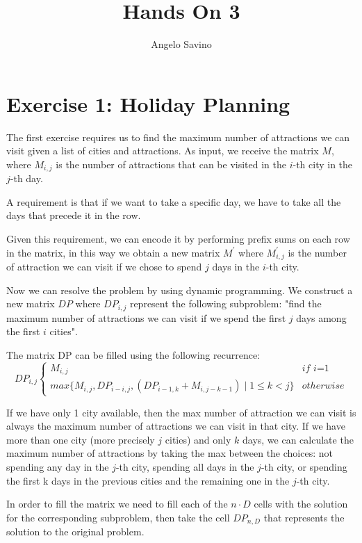 \documentclass[12pt,a4paper]{article}
\title{Hands On 3}
\author{Angelo Savino}
\begin{document}
\maketitle

\section*{Exercise 1: Holiday Planning}

The first exercise requires us to find the maximum number of attractions we can visit given a list of cities and attractions.
As input, we receive the matrix $M$, where $M_{i,j}$ is the number of attractions that can be visited in the $i$-th city in the $j$-th day. 

A requirement is that if we want to take a specific day, we have to take all the days that precede it in the row.

Given this requirement, we can encode it by performing prefix sums on each row in the matrix, in this way we obtain a new matrix $M^\prime$ where $M^\prime_{i,j}$ is the number of attraction we can visit if we chose to spend $j$ days in the $i$-th city.

Now we can resolve the problem by using dynamic programming. We construct a new matrix $DP$ where $DP_{i,j}$ represent the following subproblem: "find the maximum number of attractions we can visit if we spend the first $j$ days among the first $i$ cities".

The matrix DP can be filled using the following recurrence: 
\[
DP_{i,j} 
\left\{ 
    \begin{array}{lr}
        M_{i,j} &\textit{if i=1} \\
        max \{ M_{i,j}, DP_{i-i,j}, (DP_{i-1,k} + M_{i,j-k-1}) \mid 1 \le k < j \} & otherwise
    \end{array} 
\right.
\]

If we have only 1 city available, then the max number of attraction we can visit is always the maximum number of attractions we can visit in that city.
If we have more than one city (more precisely $j$ cities) and only $k$ days, we can calculate the maximum number of attractions by taking the max between the choices: not spending any day in the $j$-th city, spending all days in the $j$-th city, or spending the first k days in the previous cities and the remaining one in the $j$-th city.

In order to fill the matrix we need to fill each of the $n \cdot D$ cells with the solution for the corresponding subproblem, then take the cell $DP_{n,D}$ that represents the solution to the original problem.
\end{document}
